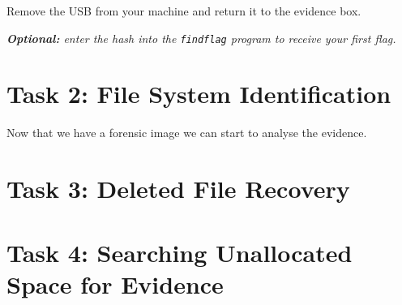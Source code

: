 \documentclass[a4paper,11pt]{article}
\begin{document}
Remove the USB from your machine and return it to the evidence box.

\textit{\textbf{Optional:} enter the hash into the \texttt{findflag} program to receive your first flag.}

\section{Task 2: File System Identification}
Now that we have a forensic image we can start to analyse the evidence.


\section{Task 3: Deleted File Recovery}

\section{Task 4: Searching Unallocated Space for Evidence}
\end{document}
